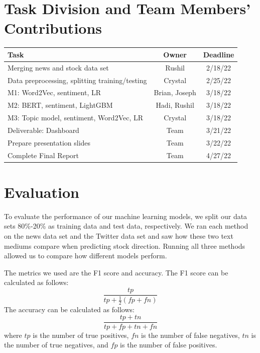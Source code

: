 \documentclass[conference]{IEEEtran}
\begin{document}
\section{Task Division and Team Members' Contributions}
\begin{table}[htp]
    \begin{center}
        \begin{tabular}{|l||c|c|} \hline\hline
            Task                                               & Owner         & Deadline  \\ \hline
            Merging news and stock data set                    & Rushil        & 2/18/22   \\
            Data preprocessing, splitting training/testing & Crystal       & 2/25/22   \\
            M1: Word2Vec, sentiment, LR                  & Brian, Joseph & 3/18/22   \\
            M2: BERT, sentiment, LightGBM                & Hadi, Rushil  & 3/18/22   \\
            M3: Topic model, sentiment, Word2Vec, LR     & Crystal       & 3/18/22 \\
            Deliverable: Dashboard                             & Team          & 3/21/22 \\
            Prepare presentation slides                             & Team          & 3/22/22 \\
            Complete Final Report                             & Team          & 4/27/22 \\
            \hline\hline
        \end{tabular}
    \end{center}
\end{table}

\section{Evaluation}
To evaluate the performance of our machine learning models, we split our data sets 80\%-20\% as training data and test data, respectively. We  ran each method on the news data set and the Twitter data set and saw how these two text mediums compare when predicting stock direction. Running all three methods allowed us to compare how different models perform.

The metrics we used are the F1 score and accuracy. The F1 score can be calculated as follows:
\begin{equation*}
 \frac{tp}{tp+\frac{1}{2}(fp+fn)}
\end{equation*}
The accuracy can be calculated as follows:
\begin{equation*}
 \frac{tp + tn}{tp + fp + tn + fn}
\end{equation*}
where $tp$ is the number of true positives, $fn$ is the number of false negatives, $tn$ is the number of true negatives, and $fp$ is the number of false positives. 
\end{document}
